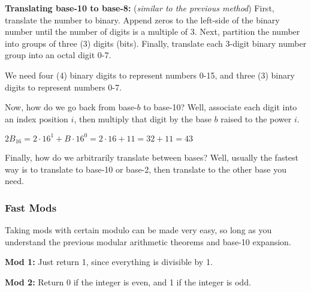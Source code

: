 \documentclass[main.tex]{subfiles}
\begin{document}
\begin{boxx}
	\textbf{Translating base-10 to base-8:} (\textit{similar to the previous method}) First, translate the number to binary. Append zeros to the left-side of the binary number until the number of digits is a multiple of 3. Next, partition the number into groups of three (3) digits (bits). Finally, translate each 3-digit binary number group into an octal digit 0-7.
\end{boxx}


\begin{rem}
	We need four (4) binary digits to represent numbers 0-15, and three (3) binary digits to represent numbers 0-7.
\end{rem}

Now, how do we go back from base-\(b\) to base-10? Well, associate each digit into an index position \(i\), then multiply that digit by the base \(b\) raised to the power \(i\).

\begin{example}
	\(2B_{16} = 2 \cdot 16^1 + B \cdot 16^0 = 2 \cdot 16 + 11 = 32 + 11 = 43\)
\end{example}

Finally, how do we arbitrarily translate between bases? Well, usually the fastest way is to translate to base-10 or base-2, then translate to the other base you need.

\subsubsection{Fast Mods}

Taking mods with certain modulo can be made very easy, so long as you understand the previous modular arithmetic theorems and base-10 expansion.

\begin{boxx}
	\textbf{Mod 1:} Just return 1, since everything is divisible by 1.
\end{boxx}

\begin{boxx}
	\textbf{Mod 2:} Return 0 if the integer is even, and 1 if the integer is odd.
\end{boxx}
\end{document}
